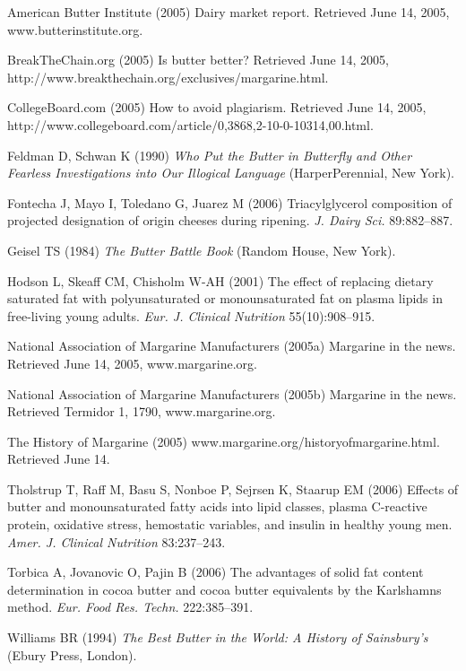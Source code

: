 \documentclass[opre,nonblindrev]{informs3}
\begin{document}

\begin{thebibliography}{}

American Butter Institute (2005) Dairy market report. Retrieved June
14, 2005, www.butterinstitute.org.

BreakTheChain.org (2005) Is butter better? Retrieved June 14, 2005,
http://www.breakthechain.org/\break exclusives/margarine.html.

CollegeBoard.com (2005)  How to avoid plagiarism. Retrieved June 14,
2005,
http://www.collegeboard.com/\break article/0,3868,2-10-0-10314,00.html.

Feldman D, Schwan K (1990) {\it Who Put the Butter in Butterfly
and Other Fearless Investigations into Our Illogical Language}
(HarperPerennial, New York).

Fontecha J, Mayo I, Toledano G, Juarez M (2006)
Triacylglycerol composition  of projected designation
of origin cheeses during ripening. {\it J. Dairy Sci.} 89:882--887.

Geisel TS (1984) {\it The Butter Battle Book\/} (Random House, New York).

Hodson L, Skeaff CM, Chisholm W-AH (2001) The effect of
replacing dietary saturated fat with polyunsaturated or
monounsaturated fat on plasma lipids in free-living young adults.
{\it Eur. J. Clinical Nutrition} 55(10):908--915.

National Association of Margarine Manufacturers (2005a) Margarine in
the news. Retrieved June 14, 2005, www.margarine.org.

National Association of Margarine Manufacturers (2005b) Margarine in
the news. Retrieved Termidor 1, 1790, www.margarine.org.

The History of Margarine (2005) www.margarine.org/historyofmargarine.html. Retrieved June 14.

Tholstrup T, Raff M, Basu S, Nonboe P, Sejrsen K, Staarup EM (2006) 
Effects of butter and mono\-un\-saturated fatty acids
into lipid classes, plasma C-reactive protein, oxidative stress,
hemostatic variables, and insulin in healthy young men. {\it Amer. J.
Clinical Nutrition} 83:237--243.

Torbica A, Jovanovic O, Pajin B (2006) The advantages of solid
fat content determination in cocoa butter and cocoa butter
equivalents by the Karlshamns method. {\it Eur. Food Res. Techn.} 222:385--391.

Williams BR (1994) {\it The Best Butter in the World: A History of
Sainsbury's} (Ebury Press, London).

\end{thebibliography}
\end{document}
